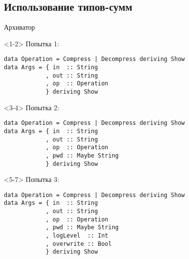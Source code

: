 \subsection{Использование типов-сумм}
\begin{frame}
\end{frame}

\begin{frame}[t,fragile]{Архиватор}

\begin{onlyenv}<1-2>
Попытка 1:
\begin{verbatim}
data Operation = Compress | Decompress deriving Show
data Args = { in  :: String
            , out :: String
            , op  :: Operation
            } deriving Show
\end{verbatim}
\end{onlyenv}

\begin{onlyenv}<3-4>
Попытка 2:
\begin{verbatim}
data Operation = Compress | Decompress deriving Show
data Args = { in  :: String
            , out :: String
            , op  :: Operation
            , pwd :: Maybe String
            } deriving Show
\end{verbatim}
\end{onlyenv}

\begin{onlyenv}<5-7>
Попытка 3:
\begin{verbatim}
data Operation = Compress | Decompress deriving Show
data Args = { in  :: String
            , out :: String
            , op  :: Operation
            , pwd :: Maybe String
            , logLevel  :: Int
            , overwrite :: Bool
            } deriving Show
\end{verbatim}
\end{onlyenv}


\end{frame}
